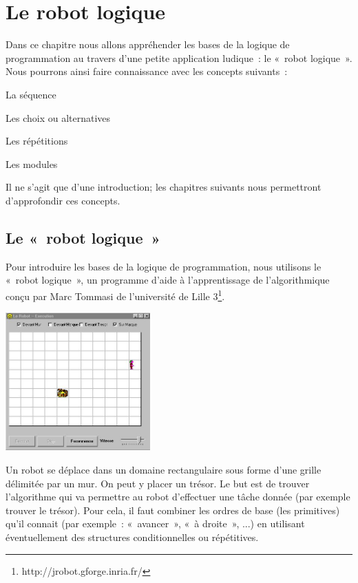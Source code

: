 \chapter{Le robot logique}

	Dans ce chapitre nous allons appréhender les bases de la logique de
	programmation au travers d'une petite application
	ludique~: le «~robot logique~». Nous pourrons ainsi faire connaissance
	avec les concepts suivants~:
	
	\begin{liste}
	\item La séquence
	\item Les choix ou alternatives
	\item Les répétitions
	\item Les modules
	\end{liste}

	Il ne s'agit que d'une introduction;
	les chapitres suivants nous permettront d'approfondir
	ces concepts.

\section{Le «~robot logique~»}

	Pour introduire les bases de la logique de programmation, nous utilisons
	le «~robot logique~», un programme d'aide à
	l'apprentissage de l'algorithmique conçu par Marc Tommasi
	de l'université de Lille
	3\footnote{http://jrobot.gforge.inria.fr/}.
	
	\begin{center}
	\includegraphics[width=5.553cm,height=5.302cm]{image/robot-grille}
	\end{center}
	
	Un robot se déplace dans un domaine rectangulaire sous 
	forme d'une grille délimitée par un mur.
	On peut y placer un trésor. Le but est de trouver
	l'algorithme qui va permettre au robot
	d'effectuer une tâche donnée (par exemple trouver le
	trésor). Pour cela, il faut combiner les ordres de base (les
	primitives) qu'il connait (par exemple~: «~avancer~»,
	«~à droite~», ...) en utilisant éventuellement des structures
	conditionnelles ou répétitives.

